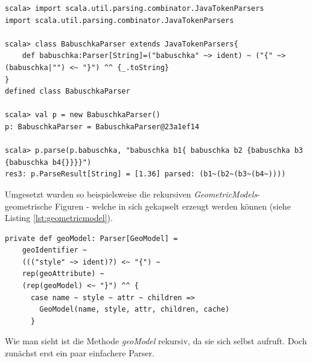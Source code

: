 \begin{lstlisting}[style=scala, caption={Einfaches Beispiel zum Parsen einer rekursiven Grammatik}, label = {lst:babuschkaexample}]
scala> import scala.util.parsing.combinator.JavaTokenParsers
import scala.util.parsing.combinator.JavaTokenParsers

scala> class BabuschkaParser extends JavaTokenParsers{
	def babuschka:Parser[String]=("babuschka" ~> ident) ~ ("{" ~> (babuschka|"") <~ "}") ^^ {_.toString}
}
defined class BabuschkaParser

scala> val p = new BabuschkaParser()
p: BabuschkaParser = BabuschkaParser@23a1ef14

scala> p.parse(p.babuschka, "babuschka b1{ babuschka b2 {babuschka b3 {babuschka b4{}}}}")
res3: p.ParseResult[String] = [1.36] parsed: (b1~(b2~(b3~(b4~))))
\end{lstlisting}Umgesetzt wurden so beispielsweise die rekursiven \textit{GeometricModels}- geometrische Figuren - welche in sich gekapselt erzeugt werden können (siehe Listing \ref{lst:geometricmodel}).
\begin{lstlisting}[style=scala, caption={Rekursive Methode zum Parsen geometrischer Figuren}, label = {lst:geometricmodel}]
private def geoModel: Parser[GeoModel] =
    geoIdentifier ~
    ((("style" ~> ident)?) <~ "{") ~
    rep(geoAttribute) ~
    (rep(geoModel) <~ "}") ^^ {
      case name ~ style ~ attr ~ children =>
        GeoModel(name, style, attr, children, cache)
      }
\end{lstlisting}Wie man sieht ist die Methode \textit{geoModel} rekursiv, da sie sich selbst aufruft. Doch zunächst erst ein paar einfachere Parser.

